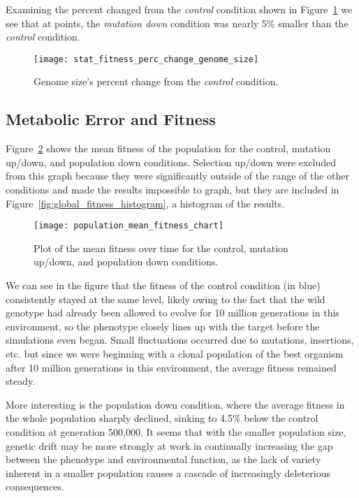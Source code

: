 Examining the percent changed from the \textit{control} condition shown in Figure~\ref{fig:genome_size_percent_change} we see that at points, the \textit{mutation down} condition was nearly 5\% smaller than the \textit{control} condition. 

\begin{figure}[H]
	\centering
	\texttt{[image: stat\_fitness\_perc\_change\_genome\_size]}
	\caption[Genome size - percent change]{Genome size's percent change from the \textit{control} condition.}
	\label{fig:genome_size_percent_change}
\end{figure}


\subsection{Metabolic Error and Fitness}
Figure~\ref{fig:mean_fitness_plot} shows the mean fitness of the population for the control, mutation up/down, and population down conditions. Selection up/down were excluded from this graph because they were significantly outside of the range of the other conditions and made the results impossible to graph, but they are included in Figure~\ref{fig:global_fitness_histogram}, a histogram of the results.

\begin{figure}[H]
	\texttt{[image: population\_mean\_fitness\_chart]}
	\caption[Mean fitness]{Plot of the mean fitness over time for the control, mutation up/down, and population down conditions.}
	\label{fig:mean_fitness_plot}
\end{figure}

We can see in the figure that the fitness of the control condition (in blue) consistently stayed at the same level, likely owing to the fact that the wild genotype had already been allowed to evolve for 10 million generations in this environment, so the phenotype closely lines up with the target before the simulations even began. Small fluctuations occurred due to mutations, insertions, etc. but since we were beginning with a clonal population of the best organism after 10 million generations in this environment, the average fitness remained steady. 

More interesting is the population down condition, where the average fitness in the whole population sharply declined, sinking to 4.5\% below the control condition at generation 500,000. It seems that with the smaller population size, genetic drift may be more strongly at work in continually increasing the gap between the phenotype and environmental function, as the lack of variety inherent in a smaller population causes a cascade of increasingly deleterious consequences. 


